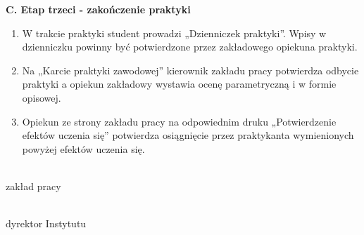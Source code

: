 \documentclass[12pt,a4paper]{article}
\begin{document}
\vspace{0.5em}
\noindent \textbf{C. Etap trzeci - zakończenie praktyki}
\begin{enumerate}[label=\arabic*), leftmargin=*]
    \item W trakcie praktyki student prowadzi „Dzienniczek praktyki”. Wpisy w dzienniczku powinny być potwierdzone przez zakładowego opiekuna praktyki.
    \item Na „Karcie praktyki zawodowej” kierownik zakładu pracy potwierdza odbycie praktyki a opiekun zakładowy wystawia ocenę parametryczną i w formie opisowej.
    \item Opiekun ze strony zakładu pracy na odpowiednim druku „Potwierdzenie efektów uczenia się” potwierdza osiągnięcie przez praktykanta wymienionych powyżej efektów uczenia się.
\end{enumerate}

\vspace{3em}
\noindent
\begin{minipage}[t]{0.45\textwidth}
\centering
\dotfill\\
\small zakład pracy
\end{minipage}
\hfill
\begin{minipage}[t]{0.45\textwidth}
\centering
\dotfill\\
\small dyrektor Instytutu
\end{minipage}
\end{document}
